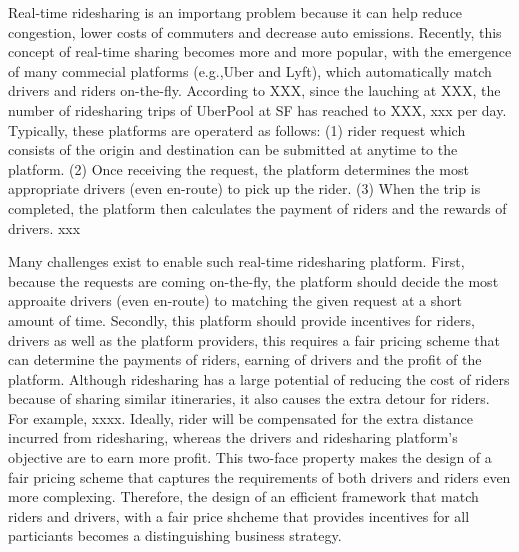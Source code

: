 Real-time ridesharing is an importang problem because it can help reduce congestion, lower costs of commuters and decrease auto emissions. Recently, this concept of real-time sharing becomes more and more popular, with the emergence of many commecial platforms (e.g.,Uber and Lyft), which automatically match drivers and riders on-the-fly. According to XXX, since the lauching at XXX, the number of ridesharing trips of UberPool at SF has reached to XXX, xxx per day. Typically, these platforms are operaterd as follows: (1) rider request which consists of the origin and destination can be submitted at anytime to the platform. (2) Once receiving the request, the platform determines the most appropriate drivers (even en-route) to pick up the rider. (3) When the trip is completed, the platform then calculates the payment of riders and the rewards of drivers. xxx




Many challenges exist to enable such real-time ridesharing platform. First, because the requests are coming on-the-fly, the platform should decide the most approaite drivers (even en-route) to matching the given request at a short amount of time. Secondly, this platform should provide incentives for riders, drivers as well as the platform providers, this requires a fair pricing scheme that can determine the payments of riders, earning of drivers and the profit of the platform. Although ridesharing has a large potential of reducing the cost of riders because of sharing similar itineraries, it also causes the extra detour for riders. For example, xxxx. Ideally, rider will be compensated for the extra distance incurred from ridesharing, whereas the drivers and ridesharing platform's objective are to earn more profit. This two-face property makes the design of a fair pricing scheme that captures the requirements of both drivers and riders even more complexing. Therefore, the design of an efficient framework that match riders and drivers, with a fair price shcheme that provides incentives for all particiants becomes a distinguishing business strategy.

